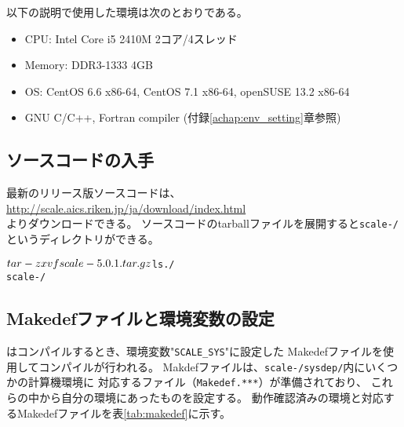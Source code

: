 以下の説明で使用した環境は次のとおりである。
\begin{itemize}
\item CPU: Intel Core i5 2410M 2コア/4スレッド
\item Memory: DDR3-1333 4GB
\item OS: CentOS 6.6 x86-64, CentOS 7.1 x86-64, openSUSE 13.2 x86-64
\item GNU C/C++, Fortran compiler (付録\ref{achap:env_setting}章参照)
\end{itemize}

\subsection{ソースコードの入手} \label{subsec:get_source_code}
最新のリリース版ソースコードは、\\
\url{http://scale.aics.riken.jp/ja/download/index.html}\\
よりダウンロードできる。
ソースコードのtarballファイルを展開すると\texttt{scale-{\version}/}というディレクトリができる。
\begin{alltt}
 $ tar -zxvf scale-{\version}.tar.gz
 $ ls ./
    scale-{\version}/
\end{alltt}

\subsection{Makedefファイルと環境変数の設定} \label{subsec:evniromnet}

\scalelib はコンパイルするとき、環境変数"\verb|SCALE_SYS|"に設定した
Makedefファイルを使用してコンパイルが行われる。
Makdefファイルは、\texttt{scale-{\version}/sysdep/}内にいくつかの計算機環境に
対応するファイル（\texttt{Makedef.***}）が準備されており、
これらの中から自分の環境にあったものを設定する。
動作確認済みの環境と対応するMakedefファイルを表\ref{tab:makedef}に示す。

